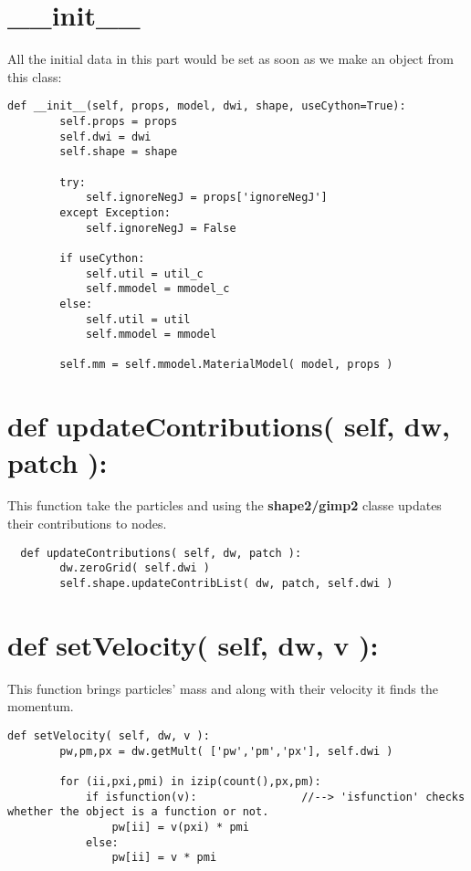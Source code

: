 \section{\_\_init\_\_}
All the initial data in this part would be set as soon as we make an object from this class:
\begin{lstlisting}
def __init__(self, props, model, dwi, shape, useCython=True):
        self.props = props
        self.dwi = dwi
        self.shape = shape
        
        try:
            self.ignoreNegJ = props['ignoreNegJ']
        except Exception:
            self.ignoreNegJ = False
            
        if useCython:
            self.util = util_c
            self.mmodel = mmodel_c
        else:
            self.util = util
            self.mmodel = mmodel
            
        self.mm = self.mmodel.MaterialModel( model, props )
\end{lstlisting}

\section{def updateContributions( self, dw, patch ):}
This function take the particles and using the \textbf{shape2/gimp2} classe updates their contributions to nodes.
\begin{lstlisting}
  def updateContributions( self, dw, patch ):
        dw.zeroGrid( self.dwi )
        self.shape.updateContribList( dw, patch, self.dwi )                
\end{lstlisting}
\section{def setVelocity( self, dw, v ):}
This function brings particles' mass and along with their velocity it finds the momentum.
\begin{lstlisting}
def setVelocity( self, dw, v ):
        pw,pm,px = dw.getMult( ['pw','pm','px'], self.dwi )
        
        for (ii,pxi,pmi) in izip(count(),px,pm):
            if isfunction(v):                //--> 'isfunction' checks whether the object is a function or not. 
                pw[ii] = v(pxi) * pmi
            else:
                pw[ii] = v * pmi              
\end{lstlisting}

